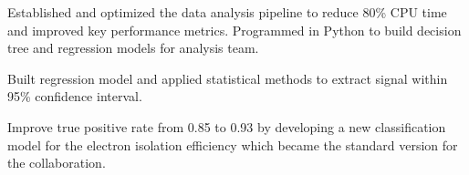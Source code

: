 \documentclass[letterpaper]{deedy-resume-openfont}
\begin{document}
\begin{tightemize}
\item Established and optimized the data analysis pipeline to reduce 80\% CPU time and improved key performance metrics.
Programmed in Python to build decision tree and regression models for analysis team.
\item Built regression model and applied statistical methods to extract signal within 95\% confidence interval.
\item Improve true positive rate from 0.85 to 0.93 by developing a new classification model for the electron isolation efficiency which became the standard version for the collaboration. 

\end{tightemize}
\end{document}
